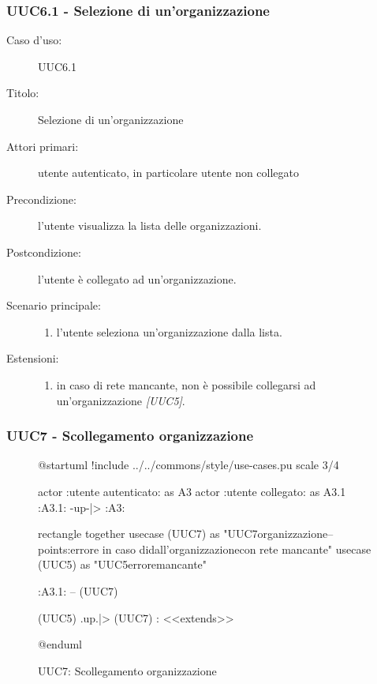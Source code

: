 \documentclass[../analisi-dei-requisiti.tex]{subfiles}
\begin{document}
\subsubsection{UUC6.1 - Selezione di un'organizzazione}%
\label{subsub:UUC6.1utente}
\begin{description}
  \item[Caso d’uso:] UUC6.1
  \item[Titolo:] Selezione di un'organizzazione
  \item[Attori primari:] utente autenticato, in particolare utente non collegato
  \item[Precondizione:] l'utente visualizza la lista delle organizzazioni.
  \item[Postcondizione:] l'utente è collegato ad un'organizzazione.
  \item[Scenario principale:]
        \begin{enumerate}
          \item l'utente seleziona un'organizzazione dalla lista.
        \end{enumerate}
  \item[Estensioni:]
        \begin{enumerate}
          \item in caso di rete mancante, non è possibile collegarsi ad un'organizzazione \emph{[UUC5]}.
        \end{enumerate}
\end{description}

\subsubsection{UUC7 - Scollegamento organizzazione}%
\label{subsub:UUC7utente}

\begin{figure}[h!]
  \centering
  \begin{plantuml}
  @startuml
  !include ../../commons/style/use-cases.pu
  scale 3/4

  actor :utente autenticato: as A3
  actor :utente collegato: as A3.1
  :A3.1: -up-|> :A3:

  rectangle {
    together {
      usecase (UUC7) as "UUC7\nScollegamento organizzazione\n--\nExtension points:\nVisualizzazione errore in caso di\nscollegamento dall'organizzazione\n con rete mancante"
      usecase (UUC5) as "UUC5\nVisualizzazione errore\nrete mancante"
    }
  }

  :A3.1: -- (UUC7)

  (UUC5) .up.|> (UUC7) : <<extends>>

  @enduml
    \end{plantuml}
  \caption{UUC7: Scollegamento organizzazione}
  \label{fig:uuc7}
\end{figure}
\end{document}
